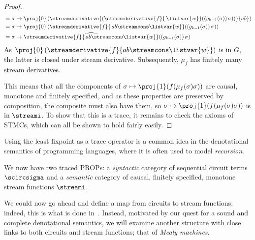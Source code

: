 \begin{proof}
\begin{align*}
            &= \sigma \mapsto \proj{0}\left(\streamderivative{\left(\streamderivative{f}{\, \listvar{w}}(\left(g_{k-1}(\sigma)\right)\sigma)\right)}{ab}\right) \\
            &= \sigma \mapsto \proj{0}\left(\streamderivative{f}{\, ab \streamcons \listvar{w}}(\left(g_{k-1}(\sigma)\right)\sigma)\right) \\
            &= \sigma \mapsto \widehat{\streamderivative{f}{\, ab \streamcons \listvar{w}}}(\left(g_{k-1}(\sigma)\right)\sigma)
        \end{align*}
    As \(\proj{0}\left(\streamderivative{f}{ab \streamcons \listvar{w}}\right)\)
    is in \(G\), the latter  is closed under stream derivative.
    Subsequently, \(\mu_f\) has finitely many stream derivatives.

    This means that all the components of
    \(\sigma \mapsto \proj{1}(f(\mu_f(\sigma)\sigma))\) are causal, monotone and
    finitely specified, and as these properties are preserved by composition,
    the composite must also have them, so
    \(\sigma \mapsto \proj{1}(f(\mu_f(\sigma)\sigma))\) is in \(\streami\).
    To show that this is a trace, it remains to check the axioms of STMCs,
    which can all be shown to hold fairly easily.
\end{proof}

\begin{remark}
    Using the least fixpoint as a trace operator is a common idea in the
    denotational semantics of programming languages, where it is often used to
    model \emph{recursion}.
\end{remark}

We now have two traced PROPs: a \emph{syntactic} category of sequential circuit
terms \(\scircsigma\) and a \emph{semantic} category of causal, finitely
specified, monotone stream functions \(\streami\).

We could now go ahead and define a map from circuits to stream functions;
indeed, this is what is done in~\cite{ghica2023compositional}.
Instead, motivated by our quest for a sound and complete denotational semantics,
we will examine another structure with close links to both circuits and stream
functions; that of \emph{Mealy machines}.



